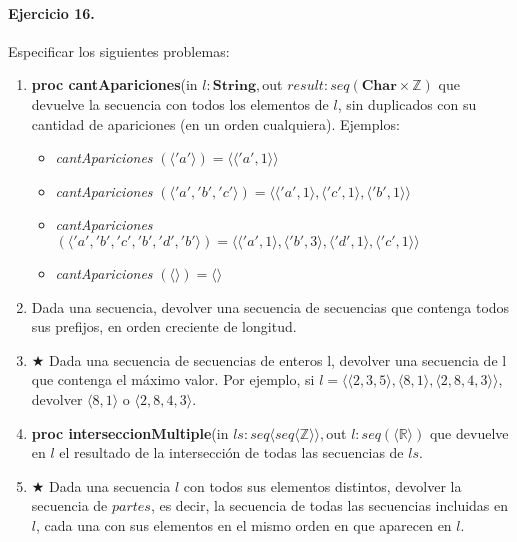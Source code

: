 \documentclass[a4paper]{article}
\begin{document}
\paragraph*{Ejercicio 16.} Especificar los siguientes problemas:
	\begin{enumerate}[label=\alph*)]
		\item \textbf{proc cantApariciones}(in $l:\textbf{String},$out $result :
			 seq(\textbf{Char}\times \mathbb{Z})$ que devuelve la secuencia con todos los elementos de $l$, sin duplicados con su cantidad de apariciones (en un orden cualquiera).
			  Ejemplos: \\
			 \begin{itemize}
			 	\item \textit{cantApariciones}
			 	$(\langle 'a'\rangle)=\langle \langle 'a',1\rangle \rangle$
			 	\item \textit{cantApariciones}
			 	$(\langle 'a','b','c'\rangle)=\langle \langle 'a',1\rangle ,\langle 'c',1\rangle
			 		,\langle 'b',1\rangle \rangle$
			 	\item \textit{cantApariciones}
			 	$(\langle 'a','b','c','b','d','b'\rangle)=\langle \langle 'a',1\rangle, 
			 	\langle 'b',3\rangle ,\langle 'd',1\rangle ,\langle 'c',1\rangle \rangle$
			 	\item \textit{cantApariciones}
			 	$(\langle \rangle)=\langle \rangle$
			 \end{itemize}
		\item Dada una secuencia, devolver una secuencia de secuencias que contenga todos sus
				prefijos, en orden creciente de longitud.
		\item $\bigstar$ Dada una secuencia de secuencias de enteros l, devolver una secuencia de
				l que contenga el máximo valor. Por ejemplo, si $l=\langle 
				\langle 2,3,5\rangle , \langle 8,1\rangle , \langle 2,8,4,3\rangle\rangle$, 
				devolver $\langle 8,1\rangle$ o $\langle 2,8,4,3\rangle$.
		\item \textbf{proc interseccionMultiple}(in $ls:seq\langle seq\langle \mathbb{Z}\rangle
		 \rangle ,$out $l: seq(\langle \mathbb{R}\rangle)$ que devuelve en $l$ el resultado de 
		 		la intersección de todas las secuencias de $ls$.
		\item $\bigstar$ Dada una secuencia $l$ con todos sus elementos distintos, devolver la
				secuencia de $partes$, es decir, la secuencia de todas las secuencias incluidas
				en $l$, cada una con sus elementos en el mismo orden en que aparecen en $l$.
	\end{enumerate}
\end{document}
